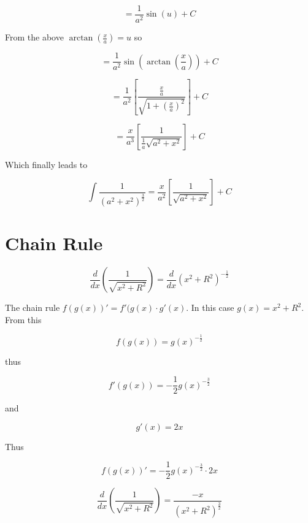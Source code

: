 \documentclass[14pt]{memoir}
\begin{document}
\begin{equation}
=  \frac{1}{a^2} \sin{(u)} + C
\end{equation}


From the above $\arctan{(\frac{x}{a})} = u$ so

\begin{equation}
=  \frac{1}{a^2} \sin{(\arctan{(\frac{x}{a})})} + C
\end{equation}

\begin{equation}
=  \frac{1}{a^2} [\frac{\frac{x}{a}}{\sqrt{1+(\frac{x}{a})^2}}] + C
\end{equation}

\begin{equation}
=  \frac{x}{a^3} [\frac{1}{\frac{1}{a} \sqrt{a^2+x^2}}] + C
\end{equation}

Which finally leads to

\begin{equation}
\int \frac{1}{(a^2 + x^2)^{\frac{3}{2}}} =  \frac{x}{a^2} [\frac{1}{\sqrt{a^2+x^2}}] + C
\end{equation}





\chapter{Chain Rule}

\begin{equation}
\frac{d}{dx} (\frac{1}{\sqrt{x^2+R^2}}) = \frac{d}{dx} (x^2+R^2)^{-\frac{1}{2}} 
\end{equation}

The chain rule $ f(g(x))' = f'(g(x) \cdot g'(x)$. In this case $g(x) = x^2 + R^2$. From this

\begin{equation}
f(g(x)) = g(x)^{-\frac{1}{2}} 
\end{equation}

thus  

\begin{equation}
f'(g(x)) = -\frac{1}{2} g(x)^{-\frac{3}{2}} 
\end{equation}

and

\begin{equation}
g'(x) = 2x
\end{equation}

Thus

\begin{equation}
f(g(x))' =  -\frac{1}{2} g(x)^{-\frac{3}{2}}  \cdot 2x
\end{equation}

\begin{equation}
\frac{d}{dx} (\frac{1}{\sqrt{x^2+R^2}}) = \frac{-x}{(x^2 + R^2)^\frac{3}{2}}
\end{equation}
\end{document}
